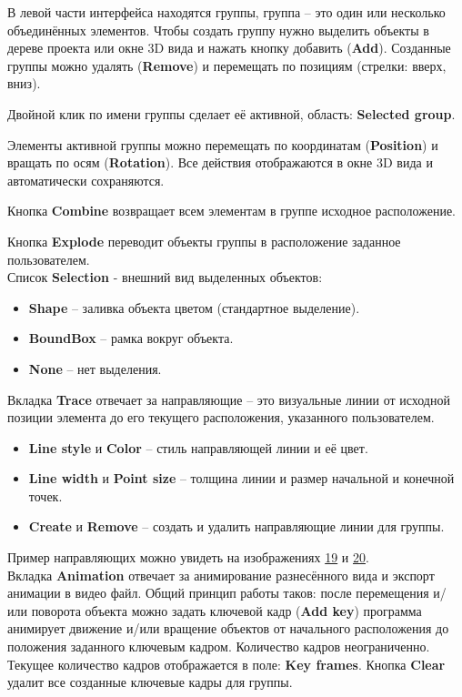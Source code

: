 \documentclass[a4paper,12pt]{article}
\begin{document}
В левой части интерфейса находятся группы, группа -- это один или несколько объединённых элементов. Чтобы создать группу нужно выделить объекты в дереве проекта или окне 3D вида и нажать кнопку добавить (\textbf{Add}). Созданные группы можно удалять (\textbf{Remove}) и перемещать по позициям (стрелки: вверх, вниз).

Двойной клик по имени группы сделает её активной, область: \textbf{Selected group}.

Элементы активной группы можно перемещать по координатам (\textbf{Position}) и вращать по осям (\textbf{Rotation}). Все действия отображаются в окне 3D вида и автоматически сохраняются.

Кнопка \textbf{Combine} возвращает всем элементам в группе исходное расположение.

Кнопка \textbf{Explode} переводит объекты группы в расположение заданное пользователем.\\

Список \textbf{Selection} - внешний вид выделенных объектов:
\begin{itemize}
	\item \textbf{Shape} -- заливка объекта цветом (стандартное выделение).
	\item \textbf{BoundBox} -- рамка вокруг объекта.
	\item \textbf{None} -- нет выделения.
\end{itemize}

\pagebreak




Вкладка \textbf{Trace} отвечает за направляющие -- это визуальные линии от исходной позиции элемента до его текущего расположения, указанного пользователем.
\begin{itemize}
	\item \textbf{Line style} и \textbf{Color} -- стиль направляющей линии и её цвет.
	\item \textbf{Line width} и \textbf{Point size} -- толщина линии и размер начальной и конечной точек.
	\item \textbf{Create} и \textbf{Remove} -- создать и удалить направляющие линии для группы.
\end{itemize}
Пример направляющих можно увидеть на изображениях \hyperref[sec:exploded_m_result]{19} и \hyperref[sec:exploded_d_result]{20}.\\

Вкладка \textbf{Animation} отвечает за анимирование разнесённого вида и экспорт анимации в видео файл.
Общий принцип работы таков: после перемещения и/или поворота объекта можно задать ключевой кадр (\textbf{Add key}) программа анимирует движение и/или вращение объектов от начального расположения до положения заданного ключевым кадром. Количество кадров неограниченно. Текущее количество кадров отображается в поле: \textbf{Key frames}. Кнопка \textbf{Clear} удалит все созданные ключевые кадры для группы.\\
\end{document}

